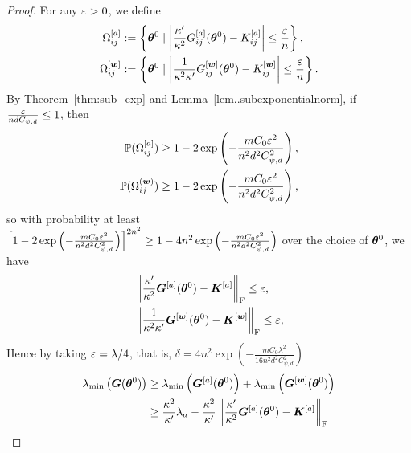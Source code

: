\documentclass{article}
\begin{document}
\begin{proof}
    For any $\varepsilon > 0$, we define
    \begin{equation*}
        \begin{aligned}
            \Omega_{ij}^{[a]}   & :=\left\{\bm{\theta}^0 \mid \left\lvert \frac{\kappa'}{\kappa^2}G^{[a]}_{ij}(\bm{\theta}^0) - K^{[a]}_{ij}\right\rvert \leq \frac{\varepsilon}{n} \right\},       \\
            \Omega_{ij}^{[\bm{w}]} & := \left\{\bm{\theta}^0 \mid \left\lvert \frac{1}{\kappa^2\kappa'}G^{[\bm{w}]}_{ij}(\bm{\theta}^0) - K^{[\bm{w}]}_{ij}\right\rvert \leq \frac{\varepsilon}{n} \right\}.
        \end{aligned}
    \end{equation*}
    By Theorem~\ref{thm:sub_exp} and Lemma~\ref{lem..subexponentialnorm}, if $\frac{\varepsilon}{ndC_{\psi,d}}\leq 1$, then
    \begin{equation*}
        \begin{aligned}
            \mathbb{P}(\Omega^{[a]}_{ij})   & \geq 1-2\exp\left(-\frac{mC_0\varepsilon^2}{n^2d^2C_{\psi,d}^2}\right), \\
            \mathbb{P}(\Omega^{(\bm{w})}_{ij}) & \geq 1-2\exp\left(-\frac{mC_0\varepsilon^2}{n^2d^2C_{\psi,d}^2}\right),
        \end{aligned}
    \end{equation*}
    so with probability at least $\left[1-2\exp\left(-\frac{mC_0\varepsilon^2}{n^2d^2C_{\psi,d}^2}\right)\right]^{2n^2} \geq 1-4n^2\exp\left(-\frac{mC_0\varepsilon^2}{n^2d^2C_{\psi,d}^2}\right)$ over the choice of $\bm{\theta}^0$, we have
    \begin{equation*}
        \begin{aligned}
             & \left\lVert\frac{\kappa'}{\kappa^2}\bm{G}^{[a]}(\bm{\theta}^0) - \bm{K}^{[a]}\right\rVert_\mathrm{F} \leq \varepsilon,      \\
             & \left\lVert\frac{1}{\kappa^2\kappa'}\bm{G}^{[\bm{w}]}(\bm{\theta}^0) - \bm{K}^{[\bm{w}]}\right\rVert_\mathrm{F} \leq \varepsilon,
        \end{aligned}
    \end{equation*}
    Hence by taking $\varepsilon=\lambda/4$, that is, $\delta=4n^2\exp\left(-\frac{mC_0\lambda^2}{16n^2d^2C_{\psi,d}^2}\right)$
    \begin{equation*}
        \begin{aligned}
            \lambda_{\min}\left(\mG(\vtheta^0)\right)
             & \geq\lambda_{\min}\left(\mG^{[a]}(\vtheta^0)\right) + \lambda_{\min}\left(\mG^{[\vw]}(\vtheta^0)\right)                                   \\
             & \geq\frac{\kappa^2}{\kappa'}\lambda_a-\frac{\kappa^2}{\kappa'} \Norm{\frac{\kappa'}{\kappa^2}\mG^{[a]}(\vtheta^0) - \mK^{[a]}}_\mathrm{F} \\

\end{aligned}
\end{equation*}
\end{proof}
\end{document}
